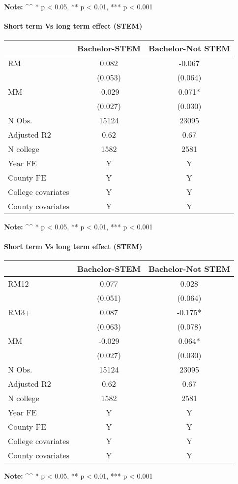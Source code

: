\documentclass[
  landscape]{article}
\begin{document}
\textbf{Note:} \^{}\^{} * p \textless{} 0.05, ** p \textless{} 0.01, ***
p \textless{} 0.001

\newpage

\hypertarget{short-term-vs-long-term-effect-stem}{%
\paragraph{Short term Vs long term effect
(STEM)}\label{short-term-vs-long-term-effect-stem}}

\begin{longtable}[]{@{}lcc@{}}
\toprule
& Bachelor-STEM & Bachelor-Not STEM \\
\midrule
\endhead
RM & 0.082 & -0.067 \\
& (0.053) & (0.064) \\
MM & -0.029 & 0.071* \\
& (0.027) & (0.030) \\
N Obs. & 15124 & 23095 \\
Adjusted R2 & 0.62 & 0.67 \\
N college & 1582 & 2581 \\
Year FE & Y & Y \\
County FE & Y & Y \\
College covariates & Y & Y \\
County covariates & Y & Y \\
\bottomrule
\end{longtable}

\textbf{Note:} \^{}\^{} * p \textless{} 0.05, ** p \textless{} 0.01, ***
p \textless{} 0.001

\newpage

\hypertarget{short-term-vs-long-term-effect-stem-1}{%
\paragraph{Short term Vs long term effect
(STEM)}\label{short-term-vs-long-term-effect-stem-1}}

\begin{longtable}[]{@{}lcc@{}}
\toprule
& Bachelor-STEM & Bachelor-Not STEM \\
\midrule
\endhead
RM12 & 0.077 & 0.028 \\
& (0.051) & (0.064) \\
RM3+ & 0.087 & -0.175* \\
& (0.063) & (0.078) \\
MM & -0.029 & 0.064* \\
& (0.027) & (0.030) \\
N Obs. & 15124 & 23095 \\
Adjusted R2 & 0.62 & 0.67 \\
N college & 1582 & 2581 \\
Year FE & Y & Y \\
County FE & Y & Y \\
College covariates & Y & Y \\
County covariates & Y & Y \\
\bottomrule
\end{longtable}

\textbf{Note:} \^{}\^{} * p \textless{} 0.05, ** p \textless{} 0.01, ***
p \textless{} 0.001
\end{document}
